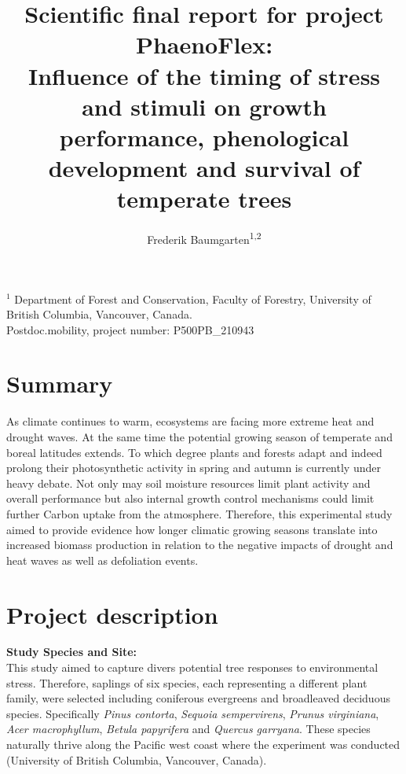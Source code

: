 \documentclass{article}
\begin{document}
	
	
	\title{Scientific final report for project PhaenoFlex: \\
	Influence of the timing of stress and stimuli on growth performance, phenological development and survival of temperate trees	%
	} 
	
	\author{Frederik Baumgarten\textsuperscript{1,2}}
	\maketitle
	
	$^1$ Department of Forest and Conservation, Faculty of Forestry, University of British Columbia, Vancouver, Canada. \\
	
	Postdoc.mobility, project number: P500PB\_210943\\
	\section*{Summary} %
	As climate continues to warm, ecosystems are facing more extreme heat and drought waves. At the same time the potential growing season of temperate and boreal latitudes extends. To which degree plants and forests adapt and indeed prolong their photosynthetic activity in spring and autumn is currently under heavy debate. Not only may soil moisture resources limit plant activity and overall performance but also internal growth control mechanisms could limit further Carbon uptake from the atmosphere. Therefore, this experimental study aimed to provide evidence how longer climatic growing seasons translate into increased biomass production in relation to the negative impacts of drought and heat waves as well as defoliation events. 
	
	\section*{Project description}
	

	\textbf{Study Species and Site:} \\
	This study aimed to capture divers potential tree responses to environmental stress. Therefore, saplings of six species, each representing a different plant family, were selected including coniferous evergreens and broadleaved deciduous species. Specifically \textit{Pinus contorta}, \textit{Sequoia sempervirens}, \textit{Prunus virginiana}, \textit{Acer macrophyllum}, \textit{Betula papyrifera} and \textit{Quercus garryana}. These species naturally thrive along the Pacific west coast where the experiment was conducted (University of British Columbia, Vancouver, Canada).\\
	
\end{document}
